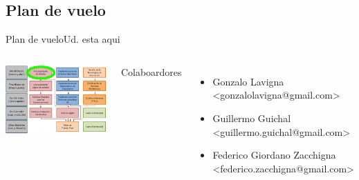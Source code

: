  \subsection{Plan de vuelo}
 \begin{frame}{Plan de vuelo}{Ud. esta aqui}
    \begin{columns}[onlytextwidth]
       \center\includegraphics[width=1.0\textwidth]{1_clase/Esquema_MSE}
       \tiny{
          Colaboardores
          \begin{itemize}
             \item{Gonzalo Lavigna             \\ <gonzalolavigna@gmail.com>}
             \item{Guillermo Guichal           \\ <guillermo.guichal@gmail.com>}
             \item{Federico Giordano Zacchigna \\ <federico.zacchigna@gmail.com>}
          \end{itemize}
        }
    \end{columns}
    \vfill
 \end{frame}

